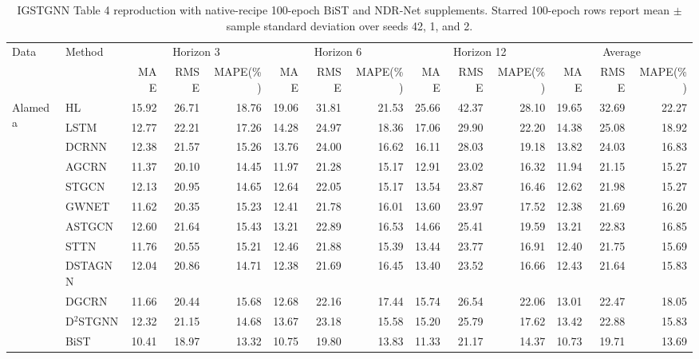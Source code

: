 \begin{table}
\centering
\caption{IGSTGNN Table 4 reproduction with native-recipe 100-epoch BiST and NDR-Net supplements. Starred 100-epoch rows report mean $\pm$ sample standard deviation over seeds 42, 1, and 2.}
\label{tab:igstgnn-table4-native100}
\setlength{\tabcolsep}{3.0pt}
\begin{tabular}{llrrrrrrrrrrrr}
\toprule
Data & Method & \multicolumn{3}{c}{Horizon 3} & \multicolumn{3}{c}{Horizon 6} & \multicolumn{3}{c}{Horizon 12} & \multicolumn{3}{c}{Average} \\
\cmidrule(lr){3-5}\cmidrule(lr){6-8}\cmidrule(lr){9-11}\cmidrule(lr){12-14}
& & MAE & RMSE & MAPE(\%) & MAE & RMSE & MAPE(\%) & MAE & RMSE & MAPE(\%) & MAE & RMSE & MAPE(\%) \\
\midrule
\multirow{16}{*}{Alameda} & HL & 15.92 & 26.71 & 18.76 & 19.06 & 31.81 & 21.53 & 25.66 & 42.37 & 28.10 & 19.65 & 32.69 & 22.27 \\
 & LSTM & 12.77 & 22.21 & 17.26 & 14.28 & 24.97 & 18.36 & 17.06 & 29.90 & 22.20 & 14.38 & 25.08 & 18.92 \\
 & DCRNN & 12.38 & 21.57 & 15.26 & 13.76 & 24.00 & 16.62 & 16.11 & 28.03 & 19.18 & 13.82 & 24.03 & 16.83 \\
 & AGCRN & 11.37 & 20.10 & 14.45 & 11.97 & 21.28 & 15.17 & 12.91 & 23.02 & 16.32 & 11.94 & 21.15 & 15.27 \\
 & STGCN & 12.13 & 20.95 & 14.65 & 12.64 & 22.05 & 15.17 & 13.54 & 23.87 & 16.46 & 12.62 & 21.98 & 15.27 \\
 & GWNET & 11.62 & 20.35 & 15.23 & 12.41 & 21.78 & 16.01 & 13.60 & 23.97 & 17.52 & 12.38 & 21.69 & 16.20 \\
 & ASTGCN & 12.60 & 21.64 & 15.43 & 13.21 & 22.89 & 16.53 & 14.66 & 25.41 & 19.59 & 13.21 & 22.83 & 16.85 \\
 & STTN & 11.76 & 20.55 & 15.21 & 12.46 & 21.88 & 15.39 & 13.44 & 23.77 & 16.91 & 12.40 & 21.75 & 15.69 \\
 & DSTAGNN & 12.04 & 20.86 & 14.71 & 12.38 & 21.69 & 16.45 & 13.40 & 23.52 & 16.66 & 12.43 & 21.64 & 15.83 \\
 & DGCRN & 11.66 & 20.44 & 15.68 & 12.68 & 22.16 & 17.44 & 15.74 & 26.54 & 22.06 & 13.01 & 22.47 & 18.05 \\
 & D$^2$STGNN & 12.32 & 21.15 & 14.68 & 13.67 & 23.18 & 15.58 & 15.20 & 25.79 & 17.62 & 13.42 & 22.88 & 15.83 \\
 & BiST & 10.41 & 18.97 & 13.32 & 10.75 & 19.80 & 13.83 & 11.33 & 21.17 & 14.37 & 10.73 & 19.71 & 13.69 \\

\end{tabular}
\end{table}
